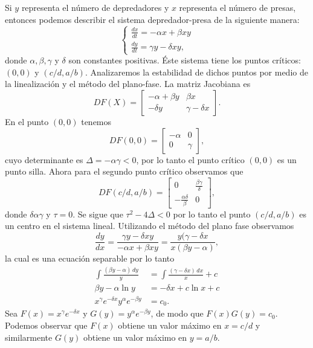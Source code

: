 \documentclass[11pt,letterpaper,draft]{report}
\newcommand\<{\langle}
\renewcommand\>{\rangle}
\begin{document}
Si $y$ representa el número de depredadores y $x$ representa el número
de presas, entonces podemos describir el sistema depredador-presa de
la siguiente manera:
\[
  \begin{cases}
    \frac{dx}{dt} = -\alpha x + \beta xy\\
    \frac{dy}{dt} = \gamma y - \delta xy,
  \end{cases}
\] donde $\alpha, \beta, \gamma$ y $\delta$ son constantes positivas.
Éste sistema tiene los puntos críticos: $(0,0)$ y $(c / d, a / b)$.
Analizaremos la estabilidad de dichos puntos por medio de la
linealización y el método del plano-fase. La matriz Jacobiana es
\[
  DF(X) = \begin{bmatrix}
    -\alpha + \beta y & \beta x\\
    -\delta y & \gamma - \delta x
  \end{bmatrix}.
\] En el punto $(0,0)$ tenemos
\[
  DF(0,0) = \begin{bmatrix}
    -\alpha & 0\\
    0 & \gamma
  \end{bmatrix},
\] cuyo determinante es $\Delta = -\alpha \gamma < 0$, por lo tanto
el punto crítico $(0,0)$ es un punto silla. Ahora para el
segundo punto crítico observamos que
\[
  DF(c / d, a / b) = \begin{bmatrix}
    0 & \frac{\beta \gamma}{\delta}\\
    -\frac{\alpha \delta}{\beta} & 0
  \end{bmatrix},
\] donde $\delta \alpha \gamma$ y $\tau = 0$. Se sigue que
$\tau^2 - 4\Delta < 0$ por lo tanto el punto $(c / d, a / b)$ es
un centro en el sistema lineal. Utilizando el método del plano
fase observamos
\[
  \frac{dy}{dx} = \frac{\gamma y - \delta x y}{-\alpha x + \beta x y} = \frac{y(\gamma - \delta x}{x(\beta y - \alpha)},
\] la cual es una ecuación separable por lo tanto
\begin{align*}
  \int \frac{(\beta y - \alpha) \, dy}{y} &= \int \frac{(\gamma - \delta x) \, dx}{x} + c\\
  \beta y - \alpha \ln y &= -\delta x + c \ln x + c\\
  x^{\gamma}e^{-\delta x}y^{\alpha}e^{-\beta y} &= c_0.
\end{align*} Sea $F(x) = x^{\gamma}e^{-\delta x}$ y
$G(y) = y^{\alpha}e^{-\beta y}$, de modo que $F(x)G(y) = c_0$.
Podemos observar que $F(x)$ obtiene un valor máximo en $x = c / d$
y similarmente $G(y)$ obtiene un valor máximo en $y = a / b$.
\end{document}
